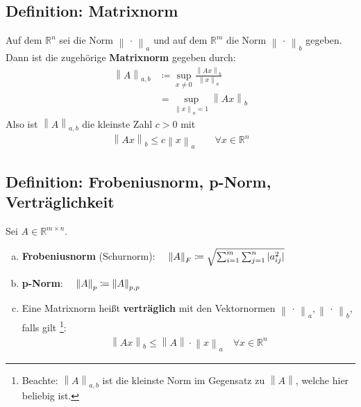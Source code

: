 \documentclass[ngerman,fontsize=11pt, paper=a4, parskip=half, titlepage=true, toc=bib]{scrbook}
\newcommand{\R}{\mathds{R}}
\newcommand{\nn}[1]{\left\| #1 \right\|}
\begin{document}
\subsection{Definition: Matrixnorm} \label{3.2.4}
Auf dem $\R^n$  sei die Norm $\nn{\,\cdot\,}_a$ und auf dem $\R^m$ die Norm $\nn{\,\cdot\,}_b$ gegeben.
Dann ist die zugehörige \textbf{Matrixnorm}  gegeben durch:
\begin{align}
	\nn{A}_{a,b} &\coloneqq \sup_{x\neq 0} \frac{\nn{Ax}_b}{\nn{x}_a} \\ \nonumber
					 &= \sup_{\nn{x}_a=1} \nn{Ax}_b \label{III.2.1} 
\end{align}
Also ist   $\nn{A}_{a,b}$ die kleinste Zahl $c>0$ mit
\begin{gather*}
	\nn{Ax}_b  \leq c\nn{x}_a \quad\quad \forall x\in \R^n
\end{gather*}

\subsection{Definition: Frobeniusnorm, p-Norm, Verträglichkeit} \label{3.2.5}
Sei $A\in \R^{m\times n}$.
\begin{enumerate}[a)]
	\item \textbf{Frobeniusnorm} (Schurnorm):
			 $ \quad \nn{A}_F \coloneqq \sqrt{\sum_{i=1}^{m}\sum_{j=1}^{n}|a_{ij}^2|}
				 \index{Norm!Frobeniusnorm}$
    \item \textbf{p-Norm}: 
			 $\quad \nn{A}_p \coloneqq \nn{A}_{p,p}
				 \index{p-Norm}$
    \item Eine Matrixnorm heißt \textbf{verträglich}  mit den Vektornormen 
			    $\nn{\,\cdot\,}_a, \nn{\,\cdot\,}_b$, falls gilt
			    \footnote{ Beachte: $\nn{A}_{a,b}$ ist die kleinste Norm im Gegensatz zu $\nn{A}$, welche hier beliebig ist.}:
				 \begin{gather*}
					 	\nn{Ax}_b \leq \nn{A}\cdot \nn{x}_a \quad \forall x\in \R^n
				 \end{gather*}
\end{enumerate}
\end{document}
